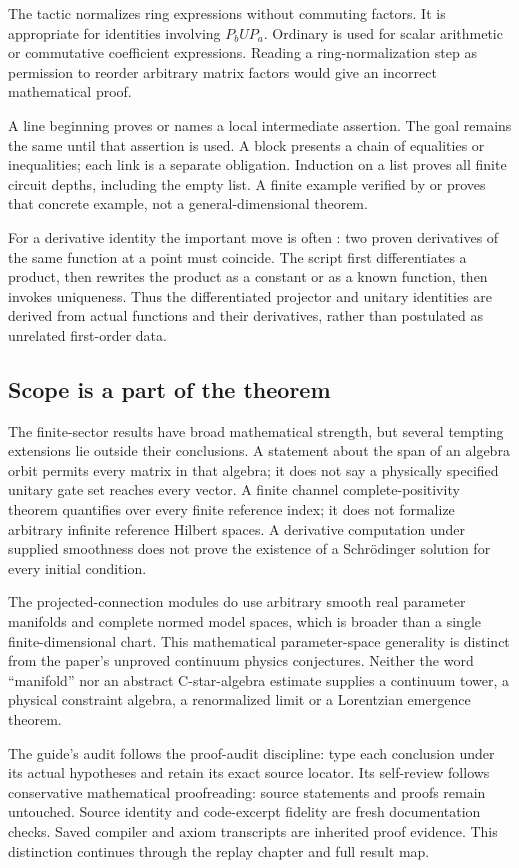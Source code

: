 The tactic  normalizes ring expressions without commuting factors. It is appropriate for identities involving $P_bUP_a$. Ordinary  is used for scalar arithmetic or commutative coefficient expressions. Reading a ring-normalization step as permission to reorder arbitrary matrix factors would give an incorrect mathematical proof.

A line beginning  proves or names a local intermediate assertion. The goal remains the same until that assertion is used. A  block presents a chain of equalities or inequalities; each link is a separate obligation. Induction on a list proves all finite circuit depths, including the empty list. A finite example verified by  or  proves that concrete example, not a general-dimensional theorem.

For a derivative identity the important move is often : two proven derivatives of the same function at a point must coincide. The script first differentiates a product, then rewrites the product as a constant or as a known function, then invokes uniqueness. Thus the differentiated projector and unitary identities are derived from actual functions and their derivatives, rather than postulated as unrelated first-order data.

\subsection{Scope is a part of the theorem}
The finite-sector results have broad mathematical strength, but several tempting extensions lie outside their conclusions. A statement about the span of an algebra orbit permits every matrix in that algebra; it does not say a physically specified unitary gate set reaches every vector. A finite channel complete-positivity theorem quantifies over every finite reference index; it does not formalize arbitrary infinite reference Hilbert spaces. A derivative computation under supplied smoothness does not prove the existence of a Schrödinger solution for every initial condition.

The projected-connection modules do use arbitrary smooth real parameter manifolds and complete normed model spaces, which is broader than a single finite-dimensional chart. This mathematical parameter-space generality is distinct from the paper's unproved continuum physics conjectures. Neither the word ``manifold'' nor an abstract C-star-algebra estimate supplies a continuum tower, a physical constraint algebra, a renormalized limit or a Lorentzian emergence theorem.

The guide's audit follows the proof-audit discipline: type each conclusion under its actual hypotheses and retain its exact source locator. Its self-review follows conservative mathematical proofreading: source statements and proofs remain untouched. Source identity and code-excerpt fidelity are fresh documentation checks. Saved compiler and axiom transcripts are inherited proof evidence. This distinction continues through the replay chapter and full result map.
